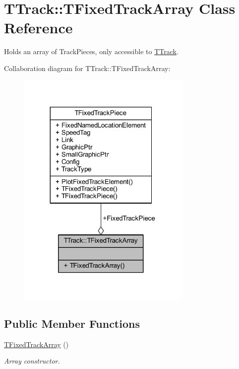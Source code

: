 \hypertarget{class_t_track_1_1_t_fixed_track_array}{}\section{T\+Track\+:\+:T\+Fixed\+Track\+Array Class Reference}
\label{class_t_track_1_1_t_fixed_track_array}


Holds an array of Track\+Pieces, only accessible to \mbox{\hyperlink{class_t_track}{T\+Track}}.  




Collaboration diagram for T\+Track\+:\+:T\+Fixed\+Track\+Array\+:\nopagebreak
\begin{figure}[H]
\begin{center}
\leavevmode
\includegraphics[width=239pt]{class_t_track_1_1_t_fixed_track_array__coll__graph}
\end{center}
\end{figure}
\subsection*{Public Member Functions}
\begin{DoxyCompactItemize}
\item 
\mbox{\label{class_t_track_1_1_t_fixed_track_array_a0fd7c1a4d4b9f09704a39c40bd202462}} 
\mbox{\hyperlink{class_t_track_1_1_t_fixed_track_array_a0fd7c1a4d4b9f09704a39c40bd202462}{T\+Fixed\+Track\+Array}} ()
\begin{DoxyCompactList}\small\item\em Array constructor. \end{DoxyCompactList}\end{DoxyCompactItemize}
